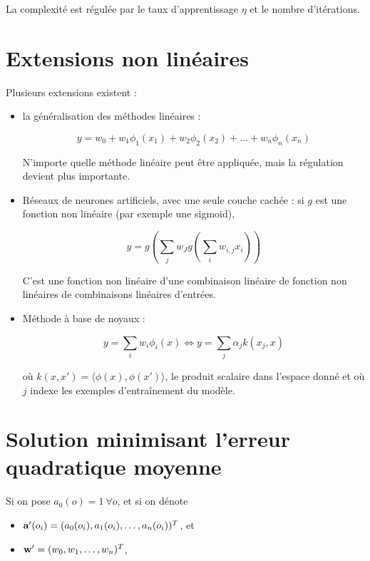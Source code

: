 	La complexité est régulée par le taux d'apprentissage $\eta$ et le nombre d'itérations.

	\section{Extensions non linéaires}

	Plusieurs extensions existent :

	\begin{itemize}
		\item la généralisation des méthodes linéaires :
	
		$$y = w_0 + w_1 \phi_1(x_1) + w_2 \phi_2(x_2) + \dots + w_n \phi_n(x_n)$$
	
		N'importe quelle méthode linéaire peut être appliquée, mais la régulation devient plus importante.
	
		\item Réseaux de neurones artificiels, avec une seule couche cachée : si $g$ est une fonction non linéaire (par exemple une sigmoid),
	
		$$y = g(\sum_j w_J g(\sum_i w_{i, j} x_i))$$
	
		C'est une fonction non linéaire d'une combinaison linéaire de fonction non linéaires de combinaisons linéaires d'entrées.
	
		\item Méthode à base de noyaux :
	
		$$y = \sum_i w_i \phi_i(x) \Leftrightarrow y = \sum_j \alpha_j k(x_j, x)$$
	
		où $k(x, x') = \langle \phi(x), \phi(x') \rangle$, le produit scalaire dans l'espace donné et où $j$ indexe les exemples d'entraînement du modèle.
	\end{itemize}


	
	
	
	\section{Solution minimisant l'erreur quadratique moyenne}
	
	Si on pose $a_0(o) = 1 \: \forall o$, et si on dénote
	
	
	\begin{itemize}
		\item $\textbf{a}'(o_i) = (a_0(o_i), a_1(o_i), \dots , a_n(o_i))^T$, et
		\item $\textbf{w}' = (w_0, w_1, \dots , w_n)^T$,
	\end{itemize}
	
